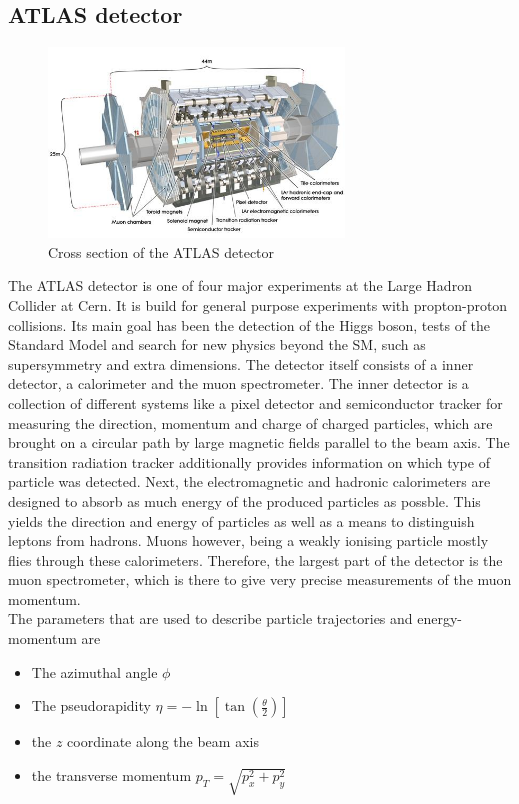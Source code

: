 \documentclass[twoside,        %
               BCOR12mm,       %
               ngerman,english, %
               fleqn,headsepline=false,footsepline=false
              ]{Vorlage/MFPREPORT}
\begin{document}
\subsection{ATLAS detector}
\begin{figure}[h!]
    \centering
    \includegraphics[width=0.7\textwidth]{fig/atlas}
\caption{Cross section of the ATLAS detector \cite{atlas}}
    \label{fig:atlas}
\end{figure}
The ATLAS detector is one of four major experiments at the Large Hadron
Collider at Cern. It is build for general purpose experiments with
propton-proton collisions. Its main goal has been the detection of the Higgs
boson, tests of the Standard Model and search for new physics beyond the SM,
such as supersymmetry and extra dimensions.
The detector itself consists of a inner detector, a calorimeter and the muon
spectrometer. The inner detector is a collection of different systems like a
pixel detector and semiconductor tracker for measuring the direction, momentum
and charge of charged particles, which are brought on a circular path by large
magnetic fields parallel to the beam axis. The transition radiation tracker
additionally provides information on which type of particle was detected. Next,
the electromagnetic and hadronic calorimeters are designed to absorb as much
energy of the produced particles as possble. This yields the direction and
energy of particles as well as a means to distinguish leptons from hadrons. 
Muons however, being a weakly ionising particle mostly flies through these
calorimeters. Therefore, the largest part of the detector is the muon
spectrometer, which is there to give very precise measurements of the muon
momentum.\\
The parameters that are used to describe particle trajectories and
energy-momentum are
\begin{itemize}
    \item The azimuthal angle $\phi$
    \item The pseudorapidity $\eta=-\ln\left[ \tan \left( \frac{\theta}{2}
        \right) \right]$
    \item the $z$ coordinate along the beam axis
    \item the transverse momentum $p_T=\sqrt{p_x^2+p_y^2}$
        
\end{itemize}
\end{document}
